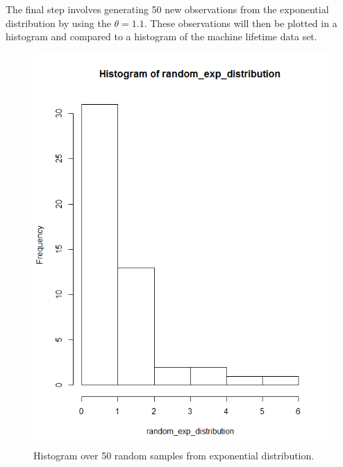 \documentclass[a4paper,12pt]{article}
\begin{document}
The final step involves generating 50 new observations from the exponential distribution by using the \(\theta = 1.1\). These observations will then be plotted in a histogram and compared to a histogram of the machine lifetime data set.

\begin{figure}[H]
\centering
\begin{minipage}[]{0.4\textwidth}
  \includegraphics[width=\textwidth]{figures/Lab1_A2_hist_exp.png}  
  \caption{Histogram over 50 random samples from exponential distribution.\label{fig:Histogram over 50 random samples from exponential distribution} }
 \end{minipage}
\begin{minipage}[]{0.4\textwidth}

\end{minipage}
\end{figure}
\end{document}
